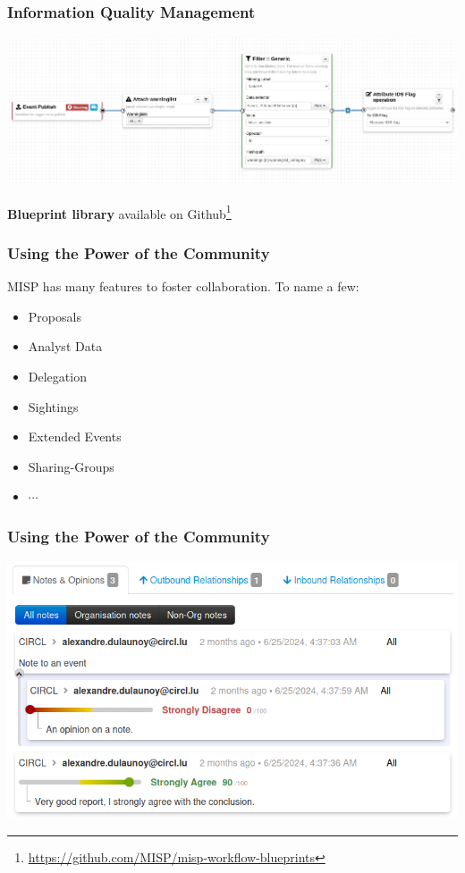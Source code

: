 \begin{frame}
    \frametitle{Information Quality Management}
    \begin{center}
        \includegraphics[width=0.99\linewidth]{wf-false-positive.png}
    \end{center}
    \begin{center}
        \textbf{Blueprint library} available on Github\footnote{\url{https://github.com/MISP/misp-workflow-blueprints}}
    \end{center}
\end{frame}

\begin{frame}
    \frametitle{Using the Power of the Community}
    MISP has many features to foster collaboration. To name a few:
    \begin{itemize}
        \item Proposals
        \item Analyst Data
        \item Delegation
        \item Sightings
        \item Extended Events
        \item Sharing-Groups
        \item $\cdots$
    \end{itemize}
\end{frame}

\begin{frame}
    \frametitle{Using the Power of the Community}
    \begin{center}
        \includegraphics[width=0.85\linewidth]{analyst-data.png}
    \end{center}
\end{frame}

